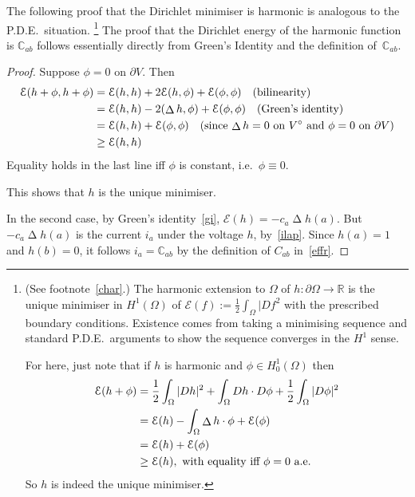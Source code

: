 \documentclass[a4paper]{amsart}
\theoremstyle{plain}
\theoremstyle{definition}
\theoremstyle{remark}
\DeclareMathOperator{\lap}{\Delta}
\begin{document}
The following proof that the Dirichlet minimiser is harmonic  is analogous to the P.D.E.\ situation.%
 \footnote{(See footnote~\ref{char}.)  The harmonic extension to $\Omega $ of $ h:\partial \Omega \to \mathbb{R} $    is the unique minimiser in $ H^1(\Omega) $ of $ \mathcal{E}(f) := \frac{1}{2} \int_{\Omega} |Df^2 $ with the prescribed boundary conditions.
  Existence comes from taking a minimising sequence and standard P.D.E.\ arguments  to show the sequence converges in the $ H^1 $ sense.   
  
  For here, just note that if $ h $ is harmonic  and $ \phi \in H^1_0(\Omega) $ then 
\begin{align*}
\mathcal{E}(h+\phi) &= \frac{1}{2}\int_{\Omega} |Dh |^2 + 
  \int_{\Omega}  Dh \cdot D\phi  +  \frac{1}{2}\int_{\Omega} |D\phi |^2 \\
&= \mathcal{E}(h)   
  -\int_{\Omega}  \lap h \cdot  \phi  +  \mathcal{E}(\phi) \\
  &= 
  \mathcal{E}(h)    +  \mathcal{E}(\phi)\\
 & \geq  \mathcal{E}(h), \text{ with equality iff $ \phi = 0 $ a.e.}
\end{align*} 
So $ h $ is indeed the unique minimiser.
}
The proof that the Dirichlet energy of the harmonic function is $ \mathbb{C}_{ab} $ follows essentially directly from Green's Identity and the definition of~$ \mathbb{C}_{ab} $.


\begin{proof}  Suppose   $ \phi = 0 $ on $ \partial V $.  Then
\begin{align*}
\mathcal{E}(h+\phi, h+\phi) &= \mathcal{E} (h,h) + 2 \mathcal{E} ( h,\phi) + \mathcal{E}(\phi,\phi)  
                                                  \quad \text{(bilinearity)}\\
&= \mathcal{E}(h,h) - 2 (\lap h,\phi) + \mathcal{E}(\phi,\phi) \quad \text{(Green's identity)}\\
&= \mathcal{E}(h,h)   + \mathcal{E}(\phi,\phi)
\quad \text{(since $ \lap h = 0 $ on $ V^\circ $ and $ \phi = 0 $ on $ \partial V $)}\\
&\geq \mathcal{E}(h,h) 
\end{align*} 
Equality holds in the last line iff $ \phi $ is constant, i.e.\  $ \phi \equiv 0 $. 

This shows that $ h $ is the unique minimiser.


\medskip In the second case, by Green's identity~\eqref{gi},  $ \mathcal{E}(h) =  - c_a \lap h(a) $. 
But  $ - c_a \lap h(a) $ is the current $ i_a $   under the voltage $ h  $, by~\eqref{ilap}.  Since $ h(a) = 1 $ and $ h(b) = 0 $, it follows $ i_a = \mathbb{C}_{ab} $ by the definition of $ C_{ab}$ in~\eqref{effr}. 
\end{proof} 
\end{document}
